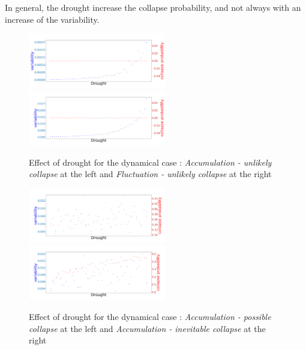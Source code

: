 \documentclass{article}
\begin{document}
In general, the drought increase the collapse probability, and not always with an increase of the variability.


\begin{figure}[h]
\begin{center}
\includegraphics[width=6cm]{results/drought/return_never.png}
\includegraphics[width=6cm]{results/drought/equivalent_never.png}
\end{center}
\caption{\label{fig:temp}Effect of drought for the dynamical case : \textit{Accumulation - unlikely collapse} at the left and \textit{Fluctuation - unlikely collapse} at the right
}
\end{figure}


\begin{figure}[h]
\begin{center}
\includegraphics[width=6cm]{results/drought/return_moderate.png}
\includegraphics[width=6cm]{results/drought/return_always.png}
\end{center}
\caption{\label{fig:temp}Effect of drought for the dynamical case : \textit{Accumulation - possible collapse} at the left and \textit{Accumulation - inevitable collapse} at the right}
\end{figure}
\end{document}
